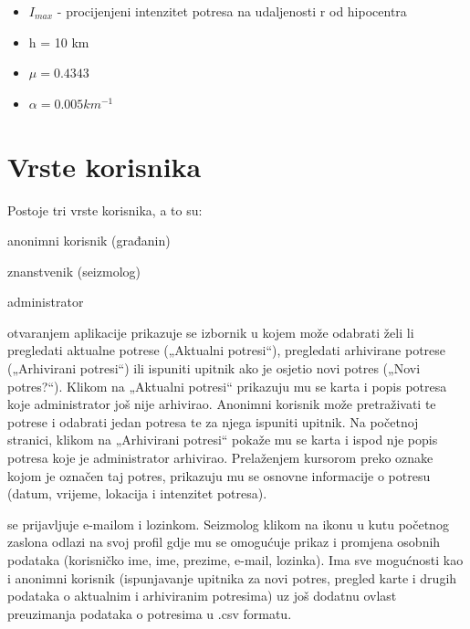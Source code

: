 \begin{itemize}                                                             
    \item $I_{max}$ - procijenjeni intenzitet potresa na udaljenosti r od hipocentra
    \item h = 10 km 
    \item $\mu=0.4343$
    \item $\alpha=0.005 km^{-1}$
    
\end{itemize} 


\section{Vrste korisnika}
Postoje tri vrste korisnika, a to su:
\begin{packed_item}
	\item anonimni korisnik (građanin)
	\item znanstvenik (seizmolog)
	\item administrator
\end{packed_item}

 otvaranjem aplikacije prikazuje se izbornik u kojem može odabrati želi li pregledati aktualne potrese („Aktualni potresi“), pregledati arhivirane potrese („Arhivirani potresi“) ili ispuniti upitnik ako je osjetio novi potres („Novi potres?“). Klikom na „Aktualni potresi“ prikazuju mu se karta i popis potresa koje administrator još nije arhivirao. Anonimni korisnik može pretraživati te potrese i odabrati jedan potresa te za njega ispuniti upitnik. Na početnoj stranici, klikom na „Arhivirani potresi“ pokaže mu se karta i ispod nje popis potresa koje je administrator arhivirao. Prelaženjem kursorom preko oznake kojom je označen taj potres, prikazuju mu se osnovne informacije o potresu (datum, vrijeme, lokacija i intenzitet potresa).

 se prijavljuje e-mailom i lozinkom. Seizmolog klikom na ikonu u kutu početnog zaslona odlazi na svoj profil gdje mu se omogućuje prikaz i promjena osobnih podataka (korisničko ime, ime, prezime, e-mail, lozinka). Ima sve mogućnosti kao i anonimni korisnik (ispunjavanje upitnika za novi potres, pregled karte i drugih podataka o aktualnim i arhiviranim potresima) uz još dodatnu ovlast preuzimanja podataka o potresima u .csv formatu.

